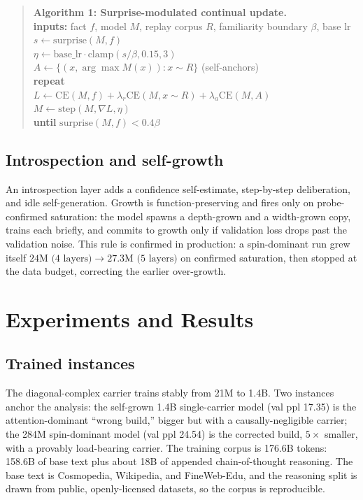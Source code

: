 \documentclass[10pt,twocolumn]{article}
\begin{document}
\begin{quote}\small\noindent\textbf{Algorithm 1: Surprise-modulated continual update.}\\
\textbf{inputs:} fact $f$, model $M$, replay corpus $R$, familiarity boundary $\beta$, base lr\\
$s \leftarrow \mathrm{surprise}(M, f)$\\
$\eta \leftarrow \text{base\_lr} \cdot \mathrm{clamp}(s/\beta, 0.15, 3)$\\
$A \leftarrow \{ (x, \arg\max M(x)) : x \sim R \}$ \; (self-anchors)\\
\textbf{repeat}\\
\hspace*{1em}$L \leftarrow \mathrm{CE}(M, f) + \lambda_r \mathrm{CE}(M, x{\sim}R) + \lambda_a \mathrm{CE}(M, A)$\\
\hspace*{1em}$M \leftarrow \mathrm{step}(M, \nabla L, \eta)$\\
\textbf{until} $\mathrm{surprise}(M, f) < 0.4\beta$
\end{quote}

\subsection{Introspection and self-growth}
An introspection layer adds a confidence self-estimate, step-by-step deliberation, and idle self-generation. Growth is function-preserving and fires only on probe-confirmed saturation: the model spawns a depth-grown and a width-grown copy, trains each briefly, and commits to growth only if validation loss drops past the validation noise. This rule is confirmed in production: a spin-dominant run grew itself $24\text{M (4 layers)} \to 27.3\text{M (5 layers)}$ on confirmed saturation, then stopped at the data budget, correcting the earlier over-growth.

\section{Experiments and Results}
\label{sec:experiments}
\subsection{Trained instances}
The diagonal-complex carrier trains stably from 21M to 1.4B. Two instances anchor the analysis: the self-grown 1.4B single-carrier model (val ppl 17.35) is the attention-dominant ``wrong build,'' bigger but with a causally-negligible carrier; the 284M spin-dominant model (val ppl 24.54) is the corrected build, $5\times$ smaller, with a provably load-bearing carrier. The training corpus is 176.6B tokens: 158.6B of base text plus about 18B of appended chain-of-thought reasoning. The base text is Cosmopedia, Wikipedia, and FineWeb-Edu, and the reasoning split is drawn from public, openly-licensed datasets, so the corpus is reproducible.
\end{document}
